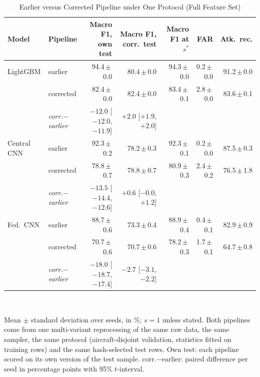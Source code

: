 \begin{table}[t]
\centering
\scriptsize
\caption{Earlier versus Corrected Pipeline under One Protocol (Full Feature Set)}
\label{tab:unifiedpipeline}
\setlength{\tabcolsep}{3pt}
\begin{tabular}{llrrrrr}
\toprule
Model & Pipeline & Macro F1, own test & Macro F1, corr.\ test & Macro F1 at $s^{*}$ & FAR & Atk.\ rec. \\
\midrule
LightGBM & earlier & 94.4{\,}$\pm${\,}0.0 & 80.4{\,}$\pm${\,}0.0 & 94.3{\,}$\pm${\,}0.0 & 0.2{\,}$\pm${\,}0.0 & 91.2{\,}$\pm${\,}0.0 \\
 & corrected & 82.4{\,}$\pm${\,}0.0 & 82.4{\,}$\pm${\,}0.0 & 83.4{\,}$\pm${\,}0.1 & 2.8{\,}$\pm${\,}0.0 & 83.6{\,}$\pm${\,}0.1 \\
 & \emph{corr.$-$earlier} & $-12.0$ [$-12.0$, $-11.9$] & $+2.0$ [$+1.9$, $+2.0$] & & & \\
\midrule
Central CNN & earlier & 92.3{\,}$\pm${\,}0.2 & 78.2{\,}$\pm${\,}0.3 & 92.3{\,}$\pm${\,}0.1 & 0.2{\,}$\pm${\,}0.0 & 87.5{\,}$\pm${\,}0.3 \\
 & corrected & 78.8{\,}$\pm${\,}0.7 & 78.8{\,}$\pm${\,}0.7 & 80.9{\,}$\pm${\,}0.3 & 2.4{\,}$\pm${\,}0.2 & 76.5{\,}$\pm${\,}1.8 \\
 & \emph{corr.$-$earlier} & $-13.5$ [$-14.4$, $-12.6$] & $+0.6$ [$-0.0$, $+1.2$] & & & \\
\midrule
Fed.\ CNN & earlier & 88.7{\,}$\pm${\,}0.6 & 73.3{\,}$\pm${\,}0.4 & 88.9{\,}$\pm${\,}0.4 & 0.4{\,}$\pm${\,}0.1 & 82.9{\,}$\pm${\,}0.9 \\
 & corrected & 70.7{\,}$\pm${\,}0.6 & 70.7{\,}$\pm${\,}0.6 & 78.2{\,}$\pm${\,}0.3 & 1.7{\,}$\pm${\,}0.1 & 64.7{\,}$\pm${\,}0.8 \\
 & \emph{corr.$-$earlier} & $-18.0$ [$-18.7$, $-17.4$] & $-2.7$ [$-3.1$, $-2.2$] & & & \\
\bottomrule
\end{tabular}
\\[2pt]
\parbox{\linewidth}{\scriptsize Mean $\pm$ standard deviation over seeds, in \%; $s=1$ unless stated. Both pipelines come from one multi-variant reprocessing of the same raw data, the same sampler, the same protocol (aircraft-disjoint validation, statistics fitted on training rows) and the same hash-selected test rows. Own test: each pipeline scored on its own version of the test sample. corr.$-$earlier: paired difference per seed in percentage points with 95\% $t$-interval.}
\end{table}
